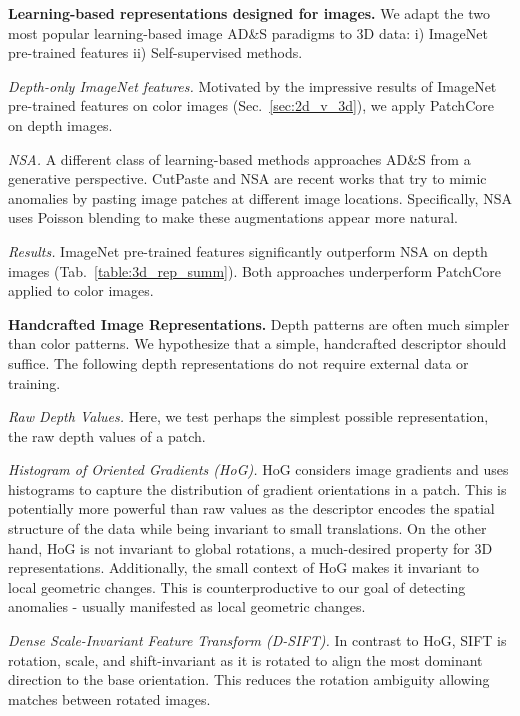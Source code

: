 \documentclass{article}
\begin{document}
\noindent \textbf{Learning-based representations designed for images.} We adapt the two most popular learning-based image AD\&S paradigms to 3D data: i) ImageNet pre-trained features ii) Self-supervised methods. 

\noindent  \textit{Depth-only ImageNet features.} Motivated by the impressive results of ImageNet pre-trained features on color images (Sec.~\ref{sec:2d_v_3d}), we apply PatchCore on depth images.

\noindent   \textit{NSA.} A different class of learning-based methods approaches AD\&S from a generative perspective. CutPaste and NSA \cite{cutpaste,nsa} are recent works that try to mimic anomalies by pasting image patches at different image locations. Specifically, NSA uses Poisson blending \cite{poisson_blending} to make these augmentations appear more natural.

\noindent  \textit{Results.} ImageNet pre-trained features significantly outperform NSA on depth images (Tab.~\ref{table:3d_rep_summ}). Both approaches underperform PatchCore applied to color images.

\noindent \textbf{Handcrafted Image Representations.} Depth patterns are often much simpler than color patterns. We hypothesize that a simple, handcrafted descriptor should suffice. The following depth representations do not require external data or training.


\noindent  \textit{Raw Depth Values.} Here, we test perhaps the simplest possible representation, the raw depth values of a patch.

\noindent  \textit{Histogram of Oriented Gradients (HoG).} HoG \cite{hog} considers image gradients and uses histograms to capture the distribution of gradient orientations in a patch. This is potentially more powerful than raw values as the descriptor encodes the spatial structure of the data while being invariant to small translations. On the other hand, HoG is not invariant to global rotations, a much-desired property for 3D representations. Additionally, the small context of HoG makes it invariant to local geometric changes. This is counterproductive to our goal of detecting anomalies - usually manifested as local geometric changes.


\noindent  \textit{Dense Scale-Invariant Feature Transform (D-SIFT).} In contrast to HoG, SIFT \cite{sift} is rotation, scale, and shift-invariant as it is rotated to align the most dominant direction to the base orientation. This reduces the rotation ambiguity allowing matches between rotated images. 
\end{document}

